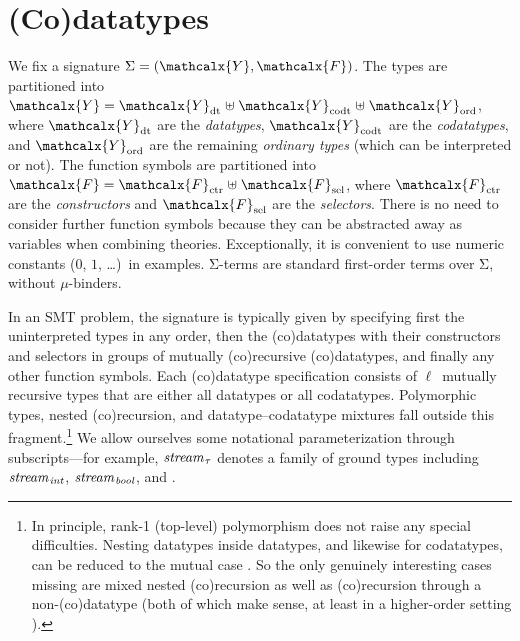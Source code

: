 \documentclass[smallcondensed,draft]{svjour3}
\newcommand\Sig{\mathrm{\Sigma}}
\newcommand\ty[1]{\textit{#1}}
\newcommand\Types{\mathcalx{Y}}
\newcommand\Funcs{\mathcalx{F}}
\newcommand\Data{\Types_{\mathrm{dt}}}
\newcommand\Codata{\Types_{\mathrm{codt}}}
\newcommand\Nondata{\Types_{\mathrm{ord}}}
\newcommand\Ctr{\Funcs_{\smash{\mathrm{ctr}}}}
\newcommand\Sel{\Funcs_{\smash{\mathrm{sel}}}}
\newcommand\vthinspace{\kern+0.083333em}
\begin{document}
\section{%
(Co)datatypes}
\label{sec:co-datatypes}


We fix a signature $\Sig = (\Types, \Funcs)$. The types are partitioned into
$\Types = \Data \mathrel{\uplus} \Codata \mathrel{\uplus} \Nondata$, where $\Data$ are the
\emph{datatypes}, $\Codata$ are the \emph{codatatypes}, and $\Nondata$ are the remaining
\emph{ordinary types} (which can be interpreted or not). The function symbols are
partitioned into $\Funcs = \Ctr \mathrel{\uplus} \Sel$, where $\Ctr$ are the
\emph{constructors} and $\Sel$ are the \emph{selectors}. There is no need to
consider further function symbols because they can be abstracted away as
variables when combining theories.
Exceptionally, it is convenient to use numeric constants ($0$, $1$, \ldots)\ in
examples.
$\Sig$-terms are standard first-order terms
over $\Sig$,
without $\mu$-binders.

In an SMT problem, the signature is typically given by specifying first the
uninterpreted %
types in any order, then the (co)datatypes with their constructors
and selectors in groups of mutually (co)recursive (co)datatypes, and
finally any other function symbols.
%
Each (co)datatype specification consists of $\ell$~mutually recursive types that are
either all datatypes or all codatatypes. Polymorphic types, nested
(co)recursion, and datatype--codatatype mixtures
fall outside this fragment.\footnote{In principle, rank-1 (top-level) polymorphism \cite{blanchette-paskevich-2013}
does not raise any special difficulties. Nesting datatypes inside datatypes,
and likewise for codatatypes, can be reduced to the mutual case
\cite{gunter-1993-not}. So the only genuinely interesting cases missing are
mixed nested (co)recursion as well as
(co)recursion through a non-(co)datatype (both of which make sense,
at least in a higher-order setting \cite{blanchette-et-al-2014-impl}).}
We allow ourselves some notational parameterization
through subscripts---for example, $\ty{stream}_{\vthinspace\tau}$ denotes a
family of ground types including
$\ty{stream}_{\vthinspace\ty{int}}$, $\ty{stream}_{\vthinspace\ty{bool}}$,
and \smash{$\ty{stream}_{\vthinspace\ty{stream}_{\vthinspace\ty{real}}}$}.
\end{document}
